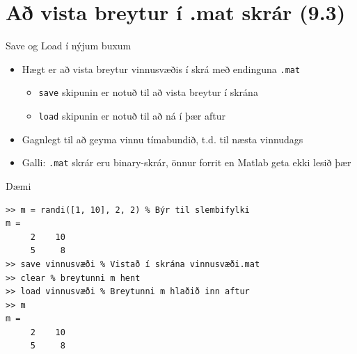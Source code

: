 \documentclass{beamer}
\begin{document}
\section{Að vista breytur í .mat skrár (9.3)}

\begin{frame}{Save og Load í nýjum buxum}
\begin{itemize}
 \item Hægt er að vista breytur vinnusvæðis í skrá með endinguna \texttt{.mat}
 \begin{itemize}
  \item \texttt{save} skipunin er notuð til að vista breytur í skrána
  \item \texttt{load} skipunin er notuð til að ná í þær aftur
 \end{itemize}
 \item Gagnlegt til að geyma vinnu tímabundið, t.d. til næsta vinnudags
 \item Galli: \texttt{.mat} skrár eru binary-skrár, önnur forrit en Matlab geta ekki lesið þær
\end{itemize}
\end{frame}

\begin{frame}[fragile]{Dæmi}
\begin{verbatim}
>> m = randi([1, 10], 2, 2) % Býr til slembifylki
m =
     2    10
     5     8
>> save vinnusvæði % Vistað í skrána vinnusvæði.mat
>> clear % breytunni m hent
>> load vinnusvæði % Breytunni m hlaðið inn aftur
>> m
m =
     2    10
     5     8
\end{verbatim}

\end{frame}
\end{document}
